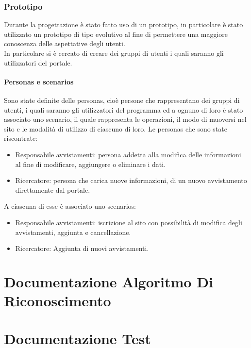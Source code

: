 \documentclass[a4paper,final,12pt]{report}
\begin{document}
\subsection{Prototipo}
Durante la progettazione è stato fatto uso di un prototipo, in particolare è stato utilizzato un prototipo di tipo evolutivo al fine di permettere una maggiore conoscenza delle aspettative degli utenti.\\
In particolare si è cercato di creare dei gruppi di utenti i quali saranno gli utilizzatori del portale.

\subsubsection{Personas e scenarios}
Sono state definite delle personas, cioè persone che rappresentano dei gruppi di utenti, i quali saranno gli utilizzatori del programma ed a ognuno di loro è stato associato uno scenario, il quale rappresenta le operazioni, il modo di muoversi nel sito e le modalità di utilizzo di ciascuno di loro.
Le personas che sono state riscontrate:
\begin{itemize}
 \item Responsabile avvistamenti: persona addetta alla modifica delle informazioni al fine di modificare, aggiungere o eliminare i dati. 
\item Ricercatore: persona che carica nuove informazioni, di un nuovo avvistamento direttamente dal portale.
 \end{itemize} 
 A ciascuna di esse è associato uno scenarios:
 \begin{itemize}
 \item Responsabile avvistamenti: iscrizione al sito con possibilità di modifica degli avvistamenti, aggiunta e cancellazione.
 \item Ricercatore: Aggiunta di nuovi avvistamenti.
 \end{itemize}

\chapter{Documentazione Algoritmo Di Riconoscimento}

\chapter{Documentazione Test}
\end{document}
